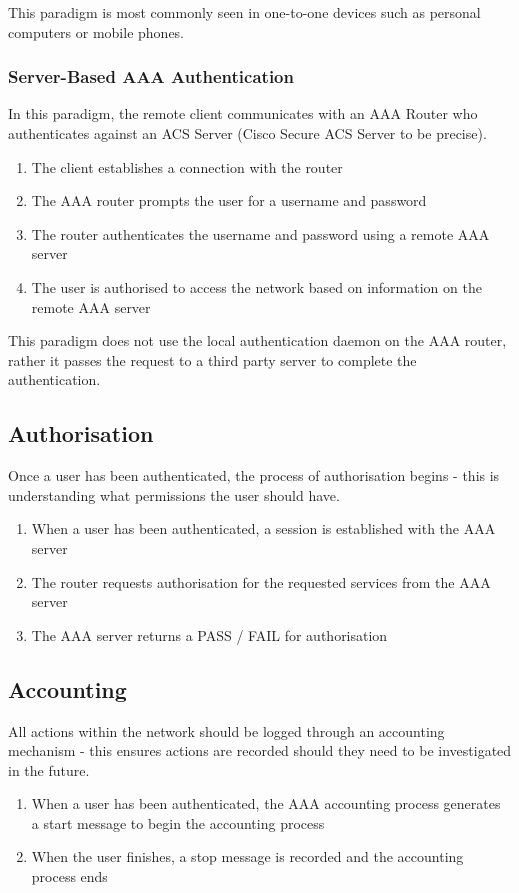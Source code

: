 This paradigm is most commonly seen in one-to-one devices such as personal computers or mobile phones.

\subsubsection{Server-Based AAA Authentication}
In this paradigm, the remote client communicates with an AAA Router who authenticates against an ACS Server (Cisco Secure ACS Server to be precise).
\begin{enumerate}
    \item The client establishes a connection with the router
    \item The AAA router prompts the user for a username and password
    \item The router authenticates the username and password using a remote AAA server
    \item The user is authorised to access the network based on information on the remote AAA server
\end{enumerate}

This paradigm does not use the local authentication daemon on the AAA router, rather it passes the request to a third party server to complete the authentication.

\subsection{Authorisation}
Once a user has been authenticated, the process of authorisation begins - this is understanding what permissions the user should have.
\begin{enumerate}
    \item When a user has been authenticated, a session is established with the AAA server
    \item The router requests authorisation for the requested services from the AAA server
    \item The AAA server returns a PASS / FAIL for authorisation
\end{enumerate}

\subsection{Accounting}
All actions within the network should be logged through an accounting mechanism - this ensures actions are recorded should they need to be investigated in the future.
\begin{enumerate}
    \item When a user has been authenticated, the AAA accounting process generates a start message to begin the accounting process
    \item When the user finishes, a stop message is recorded and the accounting process ends
\end{enumerate}

